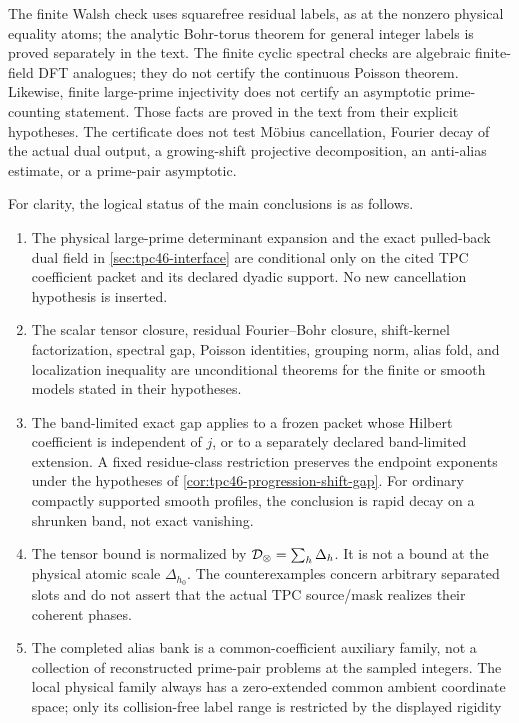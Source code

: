 The finite Walsh check uses squarefree residual labels, as at the
nonzero physical equality atoms; the analytic Bohr-torus theorem for
general integer labels is proved separately in the text.  The finite
cyclic spectral checks are algebraic finite-field DFT analogues; they
do not certify the continuous Poisson theorem.  Likewise, finite
large-prime injectivity does not certify an asymptotic prime-counting
statement.  Those facts are proved in the text from their explicit
hypotheses.  The certificate does not test M\"obius cancellation,
Fourier decay of the actual dual output, a growing-shift projective
decomposition, an anti-alias estimate, or a prime-pair asymptotic.

For clarity, the logical status of the main conclusions is as follows.
\begin{enumerate}[label=\textup{\arabic*.},leftmargin=2.2em]
 \item The physical large-prime determinant expansion and the exact
 pulled-back dual field in \cref{sec:tpc46-interface} are conditional
 only on the cited TPC coefficient packet and its declared dyadic
 support.  No new cancellation hypothesis is inserted.
 \item The scalar tensor closure, residual Fourier--Bohr closure,
 shift-kernel factorization, spectral gap, Poisson identities, grouping
 norm, alias fold, and localization inequality are unconditional
 theorems for the finite or smooth models stated in their hypotheses.
 \item The band-limited exact gap applies to a frozen packet whose
 Hilbert coefficient is independent of \(j\), or to a separately
 declared band-limited extension.  A fixed residue-class restriction
 preserves the endpoint exponents under the hypotheses of
 \cref{cor:tpc46-progression-shift-gap}.  For ordinary compactly supported
 smooth profiles, the conclusion is rapid decay on a shrunken band,
 not exact vanishing.
 \item The tensor bound is normalized by
 \(\mathcal D_\otimes=\sum_h\Delta_h\).  It is not a bound at the physical
 atomic scale \(\Delta_{h_0}\).  The counterexamples concern arbitrary
 separated slots and do not assert that the actual TPC source/mask
 realizes their coherent phases.
 \item The completed alias bank is a common-coefficient auxiliary
 family, not a collection of reconstructed prime-pair problems at the
 sampled integers.  The local physical family always has a
 zero-extended common ambient coordinate space; only its
 collision-free label range is restricted by the displayed rigidity

\end{enumerate}
